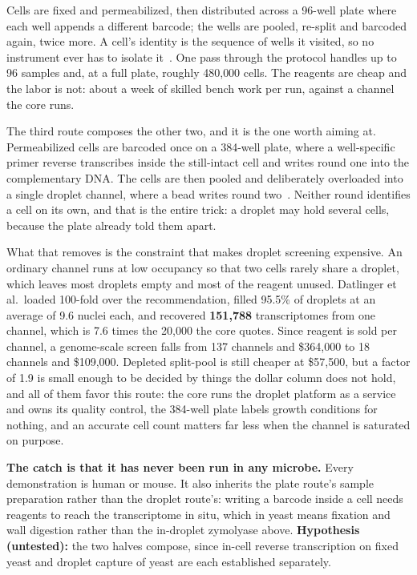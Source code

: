  Cells are fixed and permeabilized,
then distributed across a 96-well plate where each well appends a different
barcode; the wells are pooled, re-split and barcoded again, twice more. A cell's
identity is the sequence of wells it visited, so no instrument ever has to
isolate it~\citep{brettnerUltraHighthroughputMassively2024}. One pass through
the protocol handles up to 96 samples and, at a full plate, roughly 480{,}000
cells. The reagents are cheap and the labor is not: about a week of skilled
bench work per run, against a channel the core runs.

\label{sec:preindexed}
The third route composes the other two, and it is the one worth aiming at.
Permeabilized cells are barcoded once on a 384-well plate, where a well-specific
primer reverse transcribes inside the still-intact cell and writes round one into
the complementary DNA. The cells are then pooled and deliberately overloaded into
a single droplet channel, where a bead writes round
two~\citep{datlingerUltrahighthroughputSinglecellRNA2021}. Neither round
identifies a cell on its own, and that is the entire trick: a droplet may hold
several cells, because the plate already told them apart.

What that removes is the constraint that makes droplet screening expensive. An
ordinary channel runs at low occupancy so that two cells rarely share a droplet,
which leaves most droplets empty and most of the reagent unused. Datlinger et
al.\ loaded 100-fold over the recommendation, filled 95.5\% of droplets at an
average of 9.6 nuclei each, and recovered \textbf{151{,}788} transcriptomes from
one channel, which is 7.6 times the 20{,}000 the core quotes. Since reagent is
sold per channel, a genome-scale screen falls from 137 channels and \$364{,}000
to 18 channels and \$109{,}000. Depleted split-pool is still cheaper at
\$57{,}500, but a factor of 1.9 is small enough to be decided by things the
dollar column does not hold, and all of them favor this route: the core runs the
droplet platform as a service and owns its quality control, the 384-well plate
labels growth conditions for nothing, and an accurate cell count matters far less
when the channel is saturated on purpose.

\textbf{The catch is that it has never been run in any microbe.} Every
demonstration is human or mouse. It also inherits the plate route's sample
preparation rather than the droplet route's: writing a barcode inside a cell
needs reagents to reach the transcriptome in situ, which in yeast means fixation
and wall digestion rather than the in-droplet zymolyase above.
\textbf{Hypothesis (untested):} the two halves compose, since in-cell reverse
transcription on fixed yeast and droplet capture of yeast are each established
separately.

